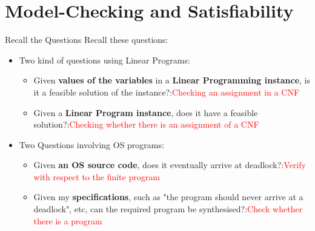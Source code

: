 \documentclass[usenames,dvipsnames]{beamer}
\begin{document}
\section{Model-Checking and Satisfiability}
\begin{frame}{Recall the Questions}
   Recall these questions:\pause
    \begin{itemize}
    \setlength\itemsep{1em}
        \item<2-> Two kind of questions using Linear Programs:
        \begin{itemize}
        \setlength\itemsep{1em}
            \item<3-> Given \textbf{values of the variables} in a \textbf{Linear Programming instance}, is it a feasible solution of the instance?:\textcolor{red}{Checking an assignment in a CNF}

            \item<4-> Given a \textbf{Linear Program instance}, does it have a feasible solution?:\textcolor{red}{Checking whether there is an assignment of a CNF}
        \end{itemize}

        \item<5-> Two Questions involving OS programs:
        \begin{itemize}
        \setlength\itemsep{1em}
            \item<6-> Given \textbf{an OS source code}, does it eventually arrive at deadlock?:\textcolor{red}{Verify with respect to the finite program}

            \item<7-> Given my \textbf{specifications}, such as "the program should never arrive at a deadlock", etc, can the required program be synthesised?:\textcolor{red}{Check whether there is a program}
        \end{itemize}
    \end{itemize}
\end{frame}
\end{document}
